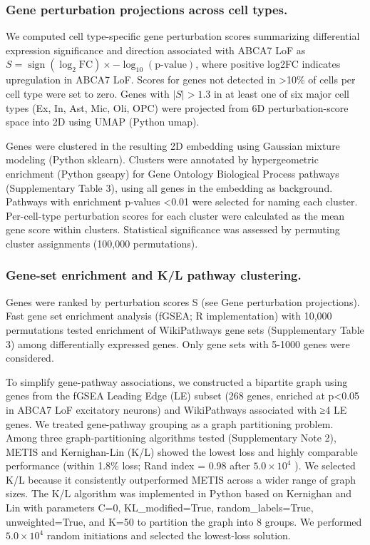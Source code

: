 \subsubsection{Gene perturbation projections across cell types.}
We computed cell type-specific gene perturbation scores summarizing differential expression significance and direction associated with ABCA7 LoF as $S = \operatorname{sign}(\log_2 \text{FC}) \times -\log_{10}(\text{p-value})$, where positive log2FC indicates upregulation in ABCA7 LoF. Scores for genes not detected in >10\% of cells per cell type were set to zero. Genes with $|S|>1.3$ in at least one of six major cell types (Ex, In, Ast, Mic, Oli, OPC) were projected from 6D perturbation-score space into 2D using UMAP (Python umap).

Genes were clustered in the resulting 2D embedding using Gaussian mixture modeling (Python sklearn). Clusters were annotated by hypergeometric enrichment (Python gseapy) for Gene Ontology Biological Process pathways (Supplementary Table 3), using all genes in the embedding as background. Pathways with enrichment p-values <0.01 were selected for naming each cluster. Per-cell-type perturbation scores for each cluster were calculated as the mean gene score within clusters. Statistical significance was assessed by permuting cluster assignments (100,000 permutations).

\subsubsection{Gene-set enrichment and K/L pathway clustering.}
Genes were ranked by perturbation scores S (see Gene perturbation projections). Fast gene set enrichment analysis (fGSEA; R implementation\supercite{Subramanian2005-gt}) with 10,000 permutations tested enrichment of WikiPathways gene sets (Supplementary Table 3) among differentially expressed genes. Only gene sets with 5-1000 genes were considered.

To simplify gene-pathway associations, we constructed a bipartite graph using genes from the fGSEA Leading Edge (LE) subset (268 genes, enriched at p<0.05 in ABCA7 LoF excitatory neurons) and WikiPathways associated with ≥4 LE genes. We treated gene-pathway grouping as a graph partitioning problem. Among three graph-partitioning algorithms tested (Supplementary Note 2), METIS and Kernighan-Lin (K/L) showed the lowest loss and highly comparable performance (within 1.8\% loss; Rand index = 0.98 after $5.0 \times 10^4$ ). We selected K/L because it consistently outperformed METIS across a wider range of graph sizes. The K/L algorithm was implemented in Python based on Kernighan and Lin\supercite{Kernighan1970-zl} with parameters C=0, KL\_modified=True, random\_labels=True, unweighted=True, and K=50 to partition the graph into 8 groups. We performed $5.0 \times 10^4$ random initiations and selected the lowest-loss solution.

